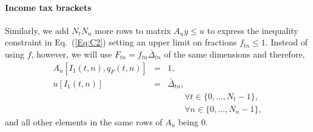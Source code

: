 \documentclass{report}[fleqn,11pt]
\begin{document}
\paragraph*{Income tax brackets}
Similarly, we add $N_t N_n$ more rows to matrix $A_uy \le u$ to express
the inequality constraint in Eq.~(\ref{Eq:C2})
setting an upper limit on fractions $f_{t n} \le 1$.
Instead of using $f$, however, we will use $F_{tn} = f_{tn}\bar{\Delta}_{tn}$
of the same dimensions and therefore,
\begin{eqnarray}
	A_u[I_1(t, n), q_F(t, n)] &=& 1, \nonumber \\
	u[I_1(t, n)] &=& \bar{\Delta}_{tn},\\
	&&\qquad\forall t \in \{0,\ldots, N_t - 1\}, \nonumber\\
	&&\qquad\forall n \in \{0,\ldots, N_n - 1\},\nonumber
\end{eqnarray}
and all other elements in the same rows of $A_u$ being $0$.
\end{document}
